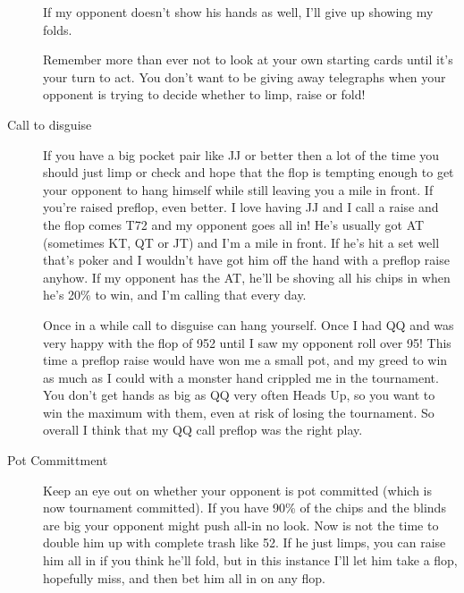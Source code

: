 \begin{description}
If my opponent doesn't show his hands as well, I'll give
up showing my folds.

Remember more than ever not to look at your own
starting cards until it's your turn to act. You
don't want to be giving away telegraphs when your
opponent is trying to decide whether to limp, raise
or fold!

\item[Call to disguise] If you have a big pocket
pair like JJ or better then a lot of the time
you should just limp or check and hope that the
flop is tempting enough to get your opponent to hang himself
while still leaving you a mile in front. If you're
raised preflop, even better. I love having JJ
and I call a raise and the flop comes T72 and my
opponent goes all in! He's usually got AT (sometimes
KT, QT or JT) and I'm a mile in front. If he's hit
a set well that's poker and I wouldn't have got him
off the hand with a preflop raise anyhow. If my
opponent has the AT, he'll be shoving
all his chips in when he's 20\% to win, and I'm calling
that every day.

Once in a while call to disguise can hang yourself. Once
I had QQ and was very happy with the flop of 952 until I
saw my opponent roll over 95! This time a preflop raise
would have won me a small pot, and my greed to win as much
as I could with a monster hand crippled me in the tournament.
You don't get hands as big as QQ very often Heads Up, so
you want to win the maximum with them, even at risk
of losing the tournament. So overall I think that my QQ call
preflop was the right play.

\item[Pot Committment] Keep an eye out on whether your opponent is pot committed
(which is now tournament committed). If you have 90\% of the chips and
the blinds are big your opponent might push all-in no look.
Now is not the time to double him up with complete trash like
52. If he just limps, you can raise him all in if you think
he'll fold, but in this instance I'll let him take a flop,
hopefully miss, and then bet him all in on any flop.

\end{description}

